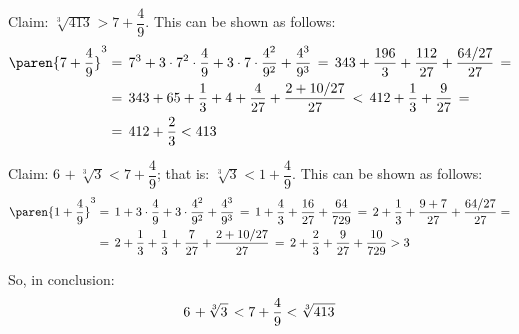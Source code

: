 Claim:
$\sqrt[3]{413 \mspace{1mu}} > 7 + \dfrac{4}{9}$.
This can be shown as follows:
\begin{align*}
  \paren{7 + \frac{4}{9}}^3
  &= \, 7^3 + 3 \cdot 7^2 \cdot \frac{4}{9} + 3 \cdot 7 \cdot \frac{4^2}{9^2} + \frac{4^3}{9^3} \,
   = \, 343 + \frac{196}{3} + \frac{112}{27} + \frac{64 / 27}{27} \, = \\
  &= \, 343 + 65 + \frac{1}{3} + 4 + \frac{4}{27} + \frac{2 + 10 / 27}{27} \,
   < \, 412 + \frac{1}{3} + \frac{9}{27} \, = \\
  &= \, 412 + \frac{2}{3}
   < 413
\end{align*}

Claim:
$6 \mspace{2mu} + \sqrt[3]{3 \mspace{1mu}} < 7 + \dfrac{4}{9}$;
that is:
$\sqrt[3]{3 \mspace{1mu}} < 1 + \dfrac{4}{9}$.
This can be shown as follows:
\begin{align*}
  \paren{1 + \frac{4}{9}}^3
  &= \, 1 + 3 \cdot \frac{4}{9} + 3 \cdot \frac{4^2}{9^2} + \frac{4^3}{9^3} \,
   = \, 1 + \frac{4}{3} + \frac{16}{27} + \frac{64}{729} \,
   = \, 2 + \frac{1}{3} + \frac{9 + 7}{27} + \frac{64 / 27}{27} = \\
  &= \, 2 + \frac{1}{3} + \frac{1}{3} + \frac{7}{27} + \frac{2 + 10 / 27}{27} \,
   = \, 2 + \frac{2}{3} + \frac{9}{27} + \frac{10}{729}
   > 3
\end{align*}

So, in conclusion:
\begin{equation*}
  6 \mspace{2mu} + \mspace{-1mu} \sqrt[3]{3 \mspace{1mu}} \mspace{2mu}
  <
  7 + \frac{4}{9}
  <
  \sqrt[3]{413 \mspace{1mu}}
\end{equation*}
